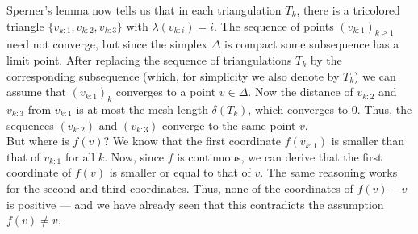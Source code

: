 \documentclass[10pt,twoside]{book}
\begin{document}
			Sperner’s lemma now tells us that in each triangulation $T_k$, there is a tricolored triangle $\{v_{k:1}, v_{k:2}, v_{k:3}\}$ with $\lambda(v_{k:i}) = i$. The sequence of points $(v_{k:1})_{k\geq 1}$ need not converge, but since the simplex $\Delta$ is compact some subsequence has a limit point. After replacing the sequence of triangulations $T_k$ by the corresponding subsequence (which, for simplicity we also denote by $T_k$) we can assume that $(v_{k:1})_k$ converges to a point
			$v \in \Delta$. Now the distance of $v_{k:2}$ and $v_{k:3}$ from $v_{k:1}$ is at most the mesh length $\delta(T_k)$, which converges to 0. Thus, the sequences $(v_{k:2})$ and $(v_{k:3})$ converge to the same point $v$.\\
			But where is $f(v)$? We know that the first coordinate $f(v_{k:1})$ is smaller than that of $v_{k:1}$ for all $k$. Now, since $f$ is continuous, we can derive that the first coordinate of $f(v)$ is smaller or equal to that of $v$. The same reasoning works for the second and third coordinates. Thus, none of the coordinates of $f(v) - v$ is positive — and we have already seen that this contradicts the assumption $f(v) \neq{v}$.\\
\end{document}
